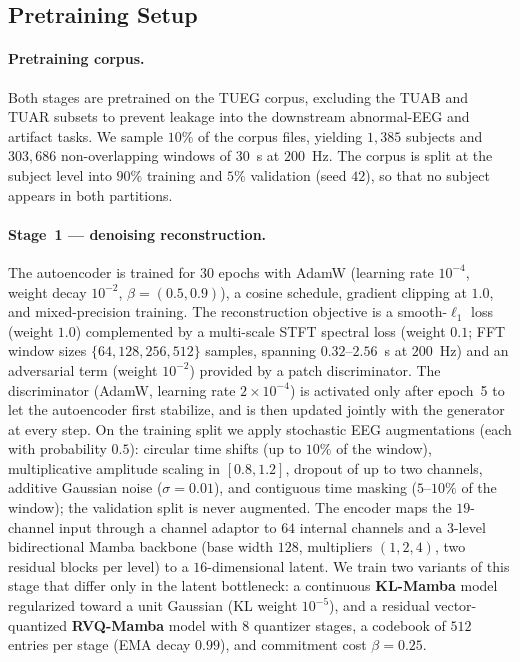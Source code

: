 \documentclass{article}
\begin{document}
\subsection{Pretraining Setup}

\paragraph{Pretraining corpus.}
Both stages are pretrained on the TUEG corpus, excluding the TUAB and TUAR subsets to prevent leakage into the downstream abnormal-EEG and artifact tasks.
We sample $10\%$ of the corpus files, yielding $1{,}385$ subjects and $303{,}686$ non-overlapping windows of $30$~s at $200$~Hz.
The corpus is split at the subject level into $90\%$ training and $5\%$ validation (seed $42$), so that no subject appears in both partitions.

\paragraph{Stage~1 — denoising reconstruction.}
The autoencoder is trained for $30$ epochs with AdamW (learning rate $10^{-4}$, weight decay $10^{-2}$, $\beta=(0.5,0.9)$), a cosine schedule, gradient clipping at $1.0$, and mixed-precision training.
The reconstruction objective is a smooth-$\ell_1$ loss (weight $1.0$) complemented by a multi-scale STFT spectral loss (weight $0.1$; FFT window sizes $\{64,128,256,512\}$ samples, spanning $0.32$--$2.56$~s at $200$~Hz) and an adversarial term (weight $10^{-2}$) provided by a patch discriminator.
The discriminator (AdamW, learning rate $2\times10^{-4}$) is activated only after epoch~5 to let the autoencoder first stabilize, and is then updated jointly with the generator at every step.
On the training split we apply stochastic EEG augmentations (each with probability $0.5$): circular time shifts (up to $10\%$ of the window), multiplicative amplitude scaling in $[0.8,1.2]$, dropout of up to two channels, additive Gaussian noise ($\sigma=0.01$), and contiguous time masking ($5$--$10\%$ of the window); the validation split is never augmented.
The encoder maps the $19$-channel input through a channel adaptor to $64$ internal channels and a $3$-level bidirectional Mamba backbone (base width $128$, multipliers $(1,2,4)$, two residual blocks per level) to a $16$-dimensional latent.
We train two variants of this stage that differ only in the latent bottleneck: a continuous \textbf{KL-Mamba} model regularized toward a unit Gaussian (KL weight $10^{-5}$), and a residual vector-quantized \textbf{RVQ-Mamba} model with $8$ quantizer stages, a codebook of $512$ entries per stage (EMA decay $0.99$), and commitment cost $\beta=0.25$.
\end{document}
